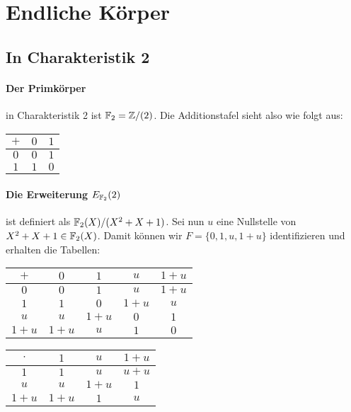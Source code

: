 \section{Endliche Körper}
\subsection{In Charakteristik 2}
\begin{comment}
Umformulieren, verschönern!
\end{comment}

\paragraph{Der Primkörper} in Charakteristik 2 ist $\mathbb{F}_2=\mathbb{Z}/(2)$. Die
Additionstafel sieht also wie folgt aus:
\begin{center}
\begin{tabular}{|c||c|c|}
\hline
$+$ & $0$ & $1$\tabularnewline
\hline
\hline
$0$ & $0$ & $1$\tabularnewline
\hline
$1$ & $1$ & $0$\tabularnewline
\hline
\end{tabular}
\end{center}

\paragraph{Die Erweiterung $E_{\mathbb{F}_2}(2)$} ist definiert als
$\mathbb{F}_2(X)/(X^2+X+1)$.
Sei nun $u$ eine Nullstelle von $X^2+X+1\in\mathbb{F}_2(X)$.
Damit können wir $F=\{0,1,u,1+u\}$ identifizieren und erhalten die Tabellen:
\begin{center}
\begin{tabular}{|c||c|c|c|c|}
\hline
$+$ & $0$ & $1$ & $u$ & $1+u$\tabularnewline
\hline
\hline
$0$ & $0$ & $1$ & $u$ & $1+u$\tabularnewline
\hline
$1$ & $1$ & $0$ & $1+u$ & $u$\tabularnewline
\hline
$u$ & $u$ & $1+u$ & $0$ & $1$\tabularnewline
\hline
$1+u$ & $1+u$ & $u$ & $1$ & $0$\tabularnewline
\hline
\end{tabular}
\end{center}
\begin{center}
\begin{tabular}{|c||c|c|c|}
\hline 
$\cdot$ & $1$ & $u$ & $1+u$\tabularnewline
\hline 
\hline 
$1$ & $1$ & $u$ & $u+u$\tabularnewline
\hline 
$u$ & $u$ & $1+u$ & $1$\tabularnewline
\hline 
$1+u$ & $1+u$ & $1$ & $u$\tabularnewline
\hline 
\end{tabular}
\end{center}

